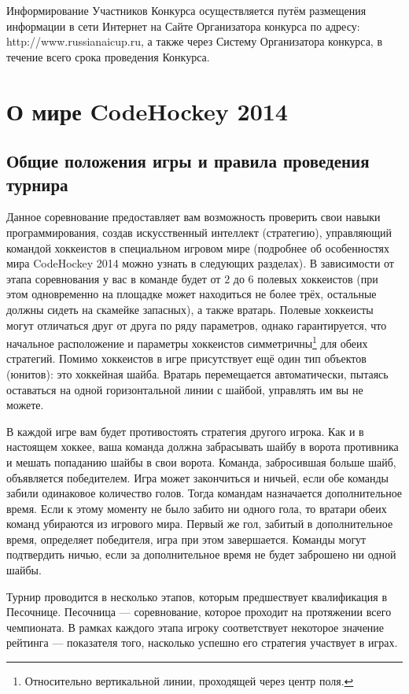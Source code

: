 Информирование Участников Конкурса осуществляется путём размещения информации в сети Интернет на Сайте Организатора конкурса по адресу:
http://www.russianaicup.ru, а также через Систему Организатора конкурса, в течение всего срока проведения Конкурса.

\chapter{О мире CodeHockey 2014}

\section{Общие положения игры и правила проведения турнира}

Данное соревнование предоставляет вам возможность проверить свои навыки программирования, создав искусственный интеллект (стратегию),
управляющий командой хоккеистов в специальном игровом мире (подробнее об особенностях мира CodeHockey 2014 можно узнать в следующих
разделах). В зависимости от этапа соревнования у вас в команде будет от $2$ до $6$ полевых хоккеистов (при этом одновременно на площадке
может находиться не более трёх, остальные должны сидеть на скамейке запасных), а также вратарь. Полевые хоккеисты могут отличаться друг от
друга по ряду параметров, однако гарантируется, что начальное расположение и параметры хоккеистов симметричны\footnote[1]{Относительно
вертикальной линии, проходящей через центр поля.} для обеих стратегий. Помимо хоккеистов в игре присутствует ещё один тип объектов (юнитов):
это хоккейная шайба. Вратарь перемещается автоматически, пытаясь оставаться на одной горизонтальной линии с шайбой, управлять им вы не
можете.

В каждой игре вам будет противостоять стратегия другого игрока. Как и в настоящем хоккее, ваша команда должна забрасывать шайбу в ворота
противника и мешать попаданию шайбы в свои ворота. Команда, забросившая больше шайб, объявляется победителем. Игра может закончиться и
ничьей, если обе команды забили одинаковое количество голов. Тогда командам назначается дополнительное время. Если к этому моменту не было
забито ни одного гола, то вратари обеих команд убираются из игрового мира. Первый же гол, забитый в дополнительное время, определяет
победителя, игра при этом завершается. Команды могут подтвердить ничью, если за дополнительное время не будет заброшено ни одной шайбы.

Турнир проводится в несколько этапов, которым предшествует квалификация в Песочнице. Песочница --- соревнование, которое проходит на
протяжении всего чемпионата. В рамках каждого этапа игроку соответствует некоторое значение рейтинга --- показателя того, насколько успешно
его стратегия участвует в играх.

